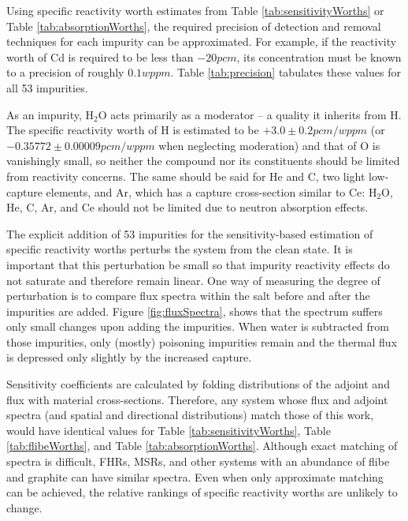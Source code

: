 \documentclass[11pt]{article}
\newcommand{\water}[0]{$\mathrm{H_2O}$}
\begin{document}
Using specific reactivity worth estimates from Table \ref{tab:sensitivityWorths} or Table \ref{tab:absorptionWorths}, the required precision of detection and removal techniques for each impurity can be approximated.
For example, if the reactivity worth of Cd is required to be less than $-20pcm$, its concentration must be known to a precision of roughly $0.1wppm$.
Table \ref{tab:precision} tabulates these values for all 53 impurities.

As an impurity, \water{} acts primarily as a moderator -- a quality it inherits from H.
The specific reactivity worth of H is estimated to be $+3.0\pm0.2 pcm/wppm$ (or $-0.35772\pm0.00009pcm/wppm$ when neglecting moderation) and that of O is vanishingly small, so neither the compound nor its constituents should be limited from reactivity concerns.
The same should be said for He and C, two light low-capture elements, and Ar, which has a capture cross-section similar to Ce: \water, He, C, Ar, and Ce should not be limited due to neutron absorption effects.

The explicit addition of 53 impurities for the sensitivity-based estimation of specific reactivity worths perturbs the system from the clean state.
It is important that this perturbation be small so that impurity reactivity effects do not saturate and therefore remain linear.
One way of measuring the degree of perturbation is to compare flux spectra within the salt before and after the impurities are added.
Figure \ref{fig:fluxSpectra}, shows that the spectrum suffers only small changes upon adding the impurities.
When water is subtracted from those impurities, only (mostly) poisoning impurities remain and the thermal flux is depressed only slightly by the increased capture.

Sensitivity coefficients are calculated by folding distributions of the adjoint and flux with material cross-sections.
Therefore, any system whose flux and adjoint spectra (and spatial and directional distributions) match those of this work, would have identical values for Table \ref{tab:sensitivityWorths}, Table \ref{tab:flibeWorths}, and Table \ref{tab:absorptionWorths}.
Although exact matching of spectra is difficult, FHRs, MSRs, and other systems with an abundance of flibe and graphite can have similar spectra.
Even when only approximate matching can be achieved, the relative rankings of specific reactivity worths are unlikely to change.
\end{document}
